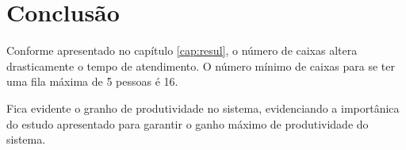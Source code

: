 \chapter{Conclusão}
Conforme apresentado no capítulo \ref{cap:resul}, o número
de caixas altera drasticamente o tempo de atendimento.
O número mínimo de caixas para se ter uma fila máxima de 5
pessoas é 16.

Fica evidente o granho de produtividade no sistema,
evidenciando a importânica do estudo apresentado para
garantir o ganho máximo de produtividade do sistema.

